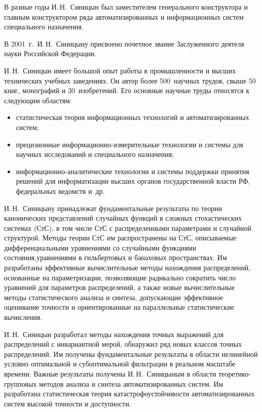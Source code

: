 \begin{multicols}{2}
     В разные годы И.\,Н.~Синицын был заместителем генерального конструктора и главным 
конструктором ряда автоматизированных и информационных систем специального назначения. 
     
     В 2001~г.\ И.\,Н.~Синицыну присвоено почетное звание Заслуженного деятеля науки 
Российской Федерации.
     
     И.\,Н.~Синицын имеет большой опыт работы в промышленности и высших технических 
учебных заведениях. Он автор более 500~научных трудов, свыше 50 книг, монографий и 
30~изобретений. Его основные научные труды относятся к следующим областям:
     \begin{itemize}
     \item статистическая теория информационных технологий и автоматизированных систем;
     \item прецизионные ин\-фор\-ма\-ци\-он\-но-из\-ме\-ри\-тель\-ные технологии и системы для научных 
исследований и специального назначения;
     \item
      информационно-аналитические технологии и системы поддержки принятия решений для 
информатизации высших органов государственной власти РФ, федеральных ведомств и~др.
     \end{itemize}
     
     И.\,Н.~Синицыну принадлежат фундаментальные результаты по теории канонических 
представлений случайных функций в сложных стохастических системах (СтС), в том числе СтС 
с\linebreak
 распределенными параметрами и случайной структурой. Методы теории СтС им 
распространены на\linebreak
 СтС, описываемые дифференциальными уравнениями со случайными 
функциями состояния,\linebreak уравнениями в гильбертовых и банаховых пространствах. Им 
разработаны эффективные вычислительные методы нахождения распределений, основанные на 
параметризации, позволяющие радикально сократить число уравнений для па\-ра\-мет\-ров 
распределений, а также новые вычислительные методы статистического анализа и синтеза,\linebreak 
допускающие эффективное оценивание точности и ориентированные на параллельные 
статистические вычисления. 
     
     И.\,Н.~Синицын разработал методы нахождения точных выражений для распределений с 
инвариантной мерой, обнаружил ряд новых классов точных распределений. Им получены 
фундаментальные результаты в области нелинейной условно оптимальной и субоптимальной 
фильтрации в реальном масштабе времени. Важные результаты получены И.\,Н.~Синицыным в 
области тео\-ре\-ти\-ко-груп\-по\-вых методов анализа и синтеза автоматизированных систем. 
Им разработана статистическая теория катастрофоустойчивости автоматизированных сис\-тем 
высокой точности и доступности. 
     

\end{multicols}
